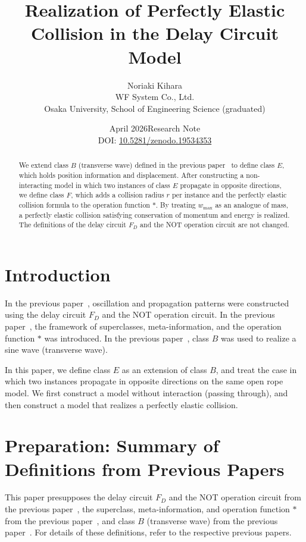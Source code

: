 \documentclass[12pt,a4paper]{article}
\title{Realization of Perfectly Elastic Collision in the Delay Circuit Model}
\author{Noriaki Kihara\\
WF System Co., Ltd.\\
Osaka University, School of Engineering Science (graduated)}
\date{April 2026\quad Research Note\\[4pt]
DOI: \href{https://doi.org/10.5281/zenodo.19534353}{10.5281/zenodo.19534353}}
\begin{document}
\maketitle

\begin{abstract}
We extend class $B$ (transverse wave) defined in the previous paper~\cite{ref3} to define class $E$, which holds position information and displacement. After constructing a non-interacting model in which two instances of class $E$ propagate in opposite directions, we define class $F$, which adds a collision radius $r$ per instance and the perfectly elastic collision formula to the operation function $*$. By treating $w_{\max}$ as an analogue of mass, a perfectly elastic collision satisfying conservation of momentum and energy is realized. The definitions of the delay circuit $F_D$ and the NOT operation circuit are not changed.
\end{abstract}

\section{Introduction}

In the previous paper~\cite{ref1}, oscillation and propagation patterns were constructed using the delay circuit $F_D$ and the NOT operation circuit. In the previous paper~\cite{ref2}, the framework of superclasses, meta-information, and the operation function $*$ was introduced. In the previous paper~\cite{ref3}, class $B$ was used to realize a sine wave (transverse wave).

In this paper, we define class $E$ as an extension of class $B$, and treat the case in which two instances propagate in opposite directions on the same open rope model. We first construct a model without interaction (passing through), and then construct a model that realizes a perfectly elastic collision.

\section{Preparation: Summary of Definitions from Previous Papers}

This paper presupposes the delay circuit $F_D$ and the NOT operation circuit from the previous paper~\cite{ref1}, the superclass, meta-information, and operation function $*$ from the previous paper~\cite{ref2}, and class $B$ (transverse wave) from the previous paper~\cite{ref3}. For details of these definitions, refer to the respective previous papers.
\end{document}
